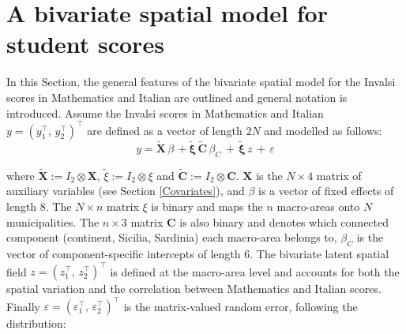 \documentclass[openany]{book}
\begin{document}
\section{A bivariate spatial model for student scores}\label{section:Model_outline}

In this Section, the general features of the bivariate spatial model for the Invalsi scores in Mathematics and Italian are outlined and general notation is introduced.
Assume the Invalsi scores in Mathematics and Italian $y = (y_1^{\top}, \, y_2^{\top})^{\top}$ are defined as a vector of length $2N$ and modelled as follows:\\
\begin{equation}
y =  \mathbf{\tilde{X}}  \, \beta \,  + 
\tilde{\mathbf{\xi}} \, \mathbf{\tilde{C}} \, \beta_C \,  +
\, \tilde{\mathbf{\xi}} \,z \, + \, \varepsilon
\label{eq:model}
\end{equation}


where $\mathbf{\tilde{X}} := I_2 \otimes \mathbf{X}$, $\tilde{\xi} := I_2 \otimes \xi$ and $\mathbf{\tilde{C}} := I_2 \otimes \mathbf{C}$. $\mathbf{X}$ is the $N \times 4$ matrix of auxiliary variables (see Section \ref{Covariates}), and $\beta$ is a vector of fixed effects of length $8$. The $N \times n$ matrix $\xi$ is binary and maps the $n$ macro-areas onto $N$ municipalities. The $n \times 3$ matrix $\mathbf{C}$ is also binary and denotes which connected component (continent, Sicilia, Sardinia) each macro-area belongs to, $\beta_C$ is the vector of component-specific intercepts of length $6$. The bivariate latent spatial field $z = (z_1^{\top}, \, z_2^{\top})^{\top}$ is defined at the macro-area level and accounts for both the spatial variation and the correlation between Mathematics and Italian scores. Finally $\varepsilon = (\varepsilon_1^{\top} , \, \varepsilon_2^{\top})^{\top}$ is the matrix-valued random error, following the distribution:
\end{document}
